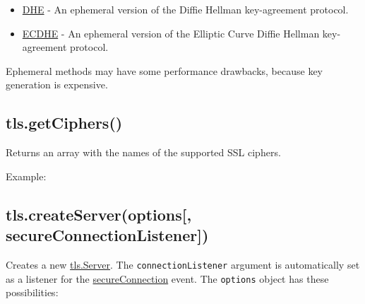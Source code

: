 \begin{itemize}
\itemsep1pt\parskip0pt
\item
  \href{https://en.wikipedia.org/wiki/Diffie\%E2\%80\%93Hellman_key_exchange}{DHE}
  - An ephemeral version of the Diffie Hellman key-agreement protocol.
\item
  \href{https://en.wikipedia.org/wiki/Elliptic_curve_Diffie\%E2\%80\%93Hellman}{ECDHE}
  - An ephemeral version of the Elliptic Curve Diffie Hellman
  key-agreement protocol.
\end{itemize}

Ephemeral methods may have some performance drawbacks, because key
generation is expensive.

\subsection{tls.getCiphers()}\label{tls.getciphers}

Returns an array with the names of the supported SSL ciphers.

Example:

\begin{Shaded}
\begin{Highlighting}[]
 \NormalTok{();}
\end{Highlighting}
\end{Shaded}

\subsection{tls.createServer(options{[},
secureConnectionListener{]})}\label{tls.createserveroptions-secureconnectionlistener}

Creates a new \hyperref[tlsux5fclassux5ftlsux5fserver]{tls.Server}. The
\texttt{connectionListener} argument is automatically set as a listener
for the \hyperref[tlsux5feventux5fsecureconnection]{secureConnection}
event. The \texttt{options} object has these possibilities:

